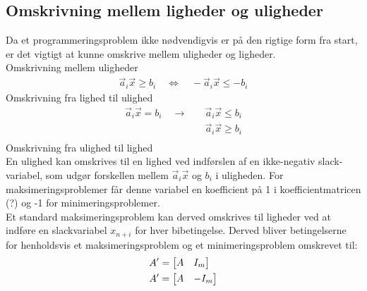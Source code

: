 \subsection{Omskrivning mellem ligheder og uligheder}
Da et programmeringsproblem ikke nødvendigvis er på den rigtige form fra start, er det vigtigt at kunne omskrive mellem uligheder og ligheder.\\
Omskrivning mellem uligheder %
\begin{align*}
	\vec{a}_i\vec{x} \geq b_i \quad \Leftrightarrow \quad -\vec{a}_i\vec{x} \leq -b_i
\end{align*}
Omskrivning fra lighed til ulighed %
\begin{align*}
	\vec{a}_i\vec{x} = b_i \quad \rightarrow \quad 	& \vec{a}_i\vec{x} \leq b_i \\
										& \vec{a}_i\vec{x} \geq b_i \\
\end{align*}
Omskrivning fra ulighed til lighed\\
En ulighed kan omskrives til en lighed ved indførslen af en ikke-negativ slack-variabel, som udgør forskellen mellem $\vec{a}_i\vec{x}$ og $b_i$ i uligheden. For maksimeringsproblemer får denne variabel en koefficient på 1 i koefficientmatricen (?) og -1 for minimeringsproblemer. \\ 
Et standard maksimeringsproblem kan derved omskrives til ligheder ved at indføre en slackvariabel $x_{n+i}$ for hver bibetingelse. Derved bliver betingelserne for henholdsvis et maksimeringsproblem og et minimeringsproblem omskrevet til:
\begin{align*}
	A' &=\begin{bmatrix} A & I_m \end{bmatrix}\\
	A' &=\begin{bmatrix} A & -I_m \end{bmatrix}
\end{align*}



